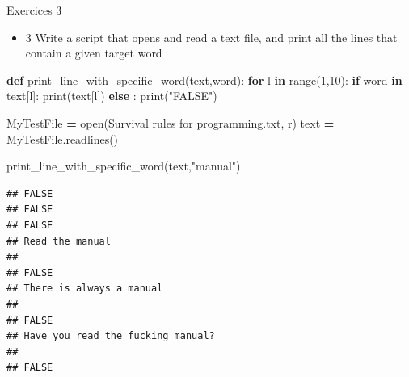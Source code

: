 \documentclass[
  8pt,
  ignorenonframetext,
]{beamer}
\newenvironment{Shaded}{\begin{snugshade}}{\end{snugshade}}
\newcommand{\BuiltInTok}[1]{#1}
\newcommand{\ControlFlowTok}[1]{\textcolor[rgb]{0.13,0.29,0.53}{\textbf{#1}}}
\newcommand{\DecValTok}[1]{\textcolor[rgb]{0.00,0.00,0.81}{#1}}
\newcommand{\KeywordTok}[1]{\textcolor[rgb]{0.13,0.29,0.53}{\textbf{#1}}}
\newcommand{\NormalTok}[1]{#1}
\newcommand{\OperatorTok}[1]{\textcolor[rgb]{0.81,0.36,0.00}{\textbf{#1}}}
\newcommand{\StringTok}[1]{\textcolor[rgb]{0.31,0.60,0.02}{#1}}
\providecommand{\tightlist}{%
  \setlength{\itemsep}{0pt}\setlength{\parskip}{0pt}}
\begin{document}
\begin{frame}[fragile]{Exercices 3}
\protect\hypertarget{exercices-3}{}
\begin{itemize}
\tightlist
\item
  3 Write a script that opens and read a text file, and print all the
  lines that contain a given target word
\end{itemize}

\begin{Shaded}
\begin{Highlighting}[]
\KeywordTok{def}\NormalTok{ print\_line\_with\_specific\_word(text,word):}
  \ControlFlowTok{for}\NormalTok{ l }\KeywordTok{in} \BuiltInTok{range}\NormalTok{(}\DecValTok{1}\NormalTok{,}\DecValTok{10}\NormalTok{):}
    \ControlFlowTok{if}\NormalTok{ word }\KeywordTok{in}\NormalTok{ text[l]:}
      \BuiltInTok{print}\NormalTok{(text[l])}
    \ControlFlowTok{else}\NormalTok{ :}
      \BuiltInTok{print}\NormalTok{(}\StringTok{"FALSE"}\NormalTok{)}
  

\NormalTok{MyTestFile }\OperatorTok{=} \BuiltInTok{open}\NormalTok{(}\StringTok{\textquotesingle{}Survival rules for programming.txt\textquotesingle{}}\NormalTok{, }\StringTok{\textquotesingle{}r\textquotesingle{}}\NormalTok{)}
\NormalTok{text }\OperatorTok{=}\NormalTok{ MyTestFile.readlines()}

\NormalTok{print\_line\_with\_specific\_word(text,}\StringTok{"manual"}\NormalTok{)}
\end{Highlighting}
\end{Shaded}

\begin{verbatim}
## FALSE
## FALSE
## FALSE
## Read the manual
## 
## FALSE
## There is always a manual
## 
## FALSE
## Have you read the fucking manual?
## 
## FALSE
\end{verbatim}
\end{frame}
\end{document}
